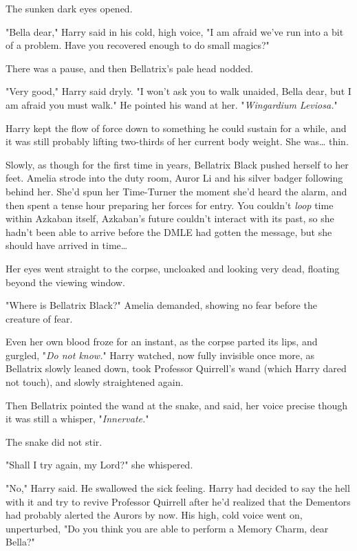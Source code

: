 The sunken dark eyes opened.

"Bella dear," Harry said in his cold, high voice, "I am afraid we've run into a 
bit of a problem. Have you recovered enough to do small magics?"

There was a pause, and then Bellatrix's pale head nodded.

"Very good," Harry said dryly. "I won't ask you to walk unaided, Bella dear, 
but I am afraid you must walk." He pointed his wand at her. "\emph{Wingardium 
Leviosa.}"

Harry kept the flow of force down to something he could sustain for a while, 
and it was still probably lifting two-thirds of her current body weight. She 
was{\ldots} thin.

Slowly, as though for the first time in years, Bellatrix Black pushed herself 
to her feet.
\sbreak
Amelia strode into the duty room, Auror Li and his silver badger following 
behind her. She'd spun her Time-Turner the moment she'd heard the alarm, and 
then spent a tense hour preparing her forces for entry. You couldn't 
\emph{loop} time within Azkaban itself, Azkaban's future couldn't interact with 
its past, so she hadn't been able to arrive before the DMLE had gotten the 
message, but she should have arrived in time{\ldots}

Her eyes went straight to the corpse, uncloaked and looking very dead, floating 
beyond the viewing window.

"Where is Bellatrix Black?" Amelia demanded, showing no fear before the 
creature of fear.

Even her own blood froze for an instant, as the corpse parted its lips, and 
gurgled, "\emph{Do not know.}"
\sbreak
Harry watched, now fully invisible once more, as Bellatrix slowly leaned down, 
took Professor Quirrell's wand (which Harry dared not touch), and slowly 
straightened again.

Then Bellatrix pointed the wand at the snake, and said, her voice precise 
though it was still a whisper, "\emph{Innervate.}"

The snake did not stir.

"Shall I try again, my Lord?" she whispered.

"No," Harry said. He swallowed the sick feeling. Harry had decided to say the 
hell with it and try to revive Professor Quirrell after he'd realized that the 
Dementors had probably alerted the Aurors by now. His high, cold voice went on, 
unperturbed, "Do you think you are able to perform a Memory Charm, dear Bella?"


